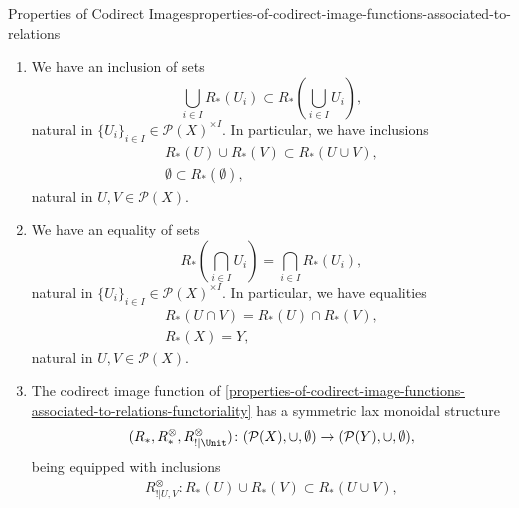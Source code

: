 \begin{proposition}{Properties of Codirect Images}{properties-of-codirect-image-functions-associated-to-relations}
\begin{enumerate}
\begin{itemize}
            \end{itemize}
        \item\label{properties-of-codirect-image-functions-associated-to-relations-lax-preservation-of-colimits}We have an inclusion of sets
            \[
                \bigcup_{i\in I}R_{*}(U_{i})%
                \subset%
                R_{*}(\bigcup_{i\in I}U_{i}),%
            \]%
            natural in $\{U_{i}\}_{i\in I}\in\mathcal{P}(X)^{\times I}$. In particular, we have inclusions%
            \[
                \begin{gathered}
                    R_{*}(U)\cup R_{*}(V) \subset R_{*}(U\cup V),\\
                    \emptyset             \subset R_{*}(\emptyset),
                \end{gathered}
            \]%
            natural in $U,V\in\mathcal{P}(X)$.
        \item\label{properties-of-codirect-image-functions-associated-to-relations-preservation-of-limits}We have an equality of sets
            \[
                    R_{*}(\bigcap_{i\in I}U_{i})%
                    =%
                    \bigcap_{i\in I}R_{*}(U_{i}),%
            \]%
            natural in $\{U_{i}\}_{i\in I}\in\mathcal{P}(X)^{\times I}$. In particular, we have equalities%
            \[
                \begin{gathered}
                    R_{*}(U\cap V) = R_{*}(U)\cap R_{*}(V),\\
                    R_{*}(X)       = Y,
                \end{gathered}
            \]%
            natural in $U,V\in\mathcal{P}(X)$.
        \item\label{properties-of-codirect-image-functions-associated-to-relations-symmetric-lax-monoidality-with-respect-to-unions}The codirect image function of \cref{properties-of-codirect-image-functions-associated-to-relations-functoriality} has a symmetric lax monoidal structure
            \[
                (R_{*},R^{\otimes}_{*},R^{\otimes}_{!|\Unit})
                \colon
                (\mathcal{P}(X),\cup,\emptyset)
                \to
                (\mathcal{P}(Y),\cup,\emptyset),
            \]%
            being equipped with inclusions%
            \[
                \begin{gathered}
                    R^{\otimes}_{!|U,V}   \colon R_{*}(U)\cup R_{*}(V) \subset R_{*}(U\cup V),\\

\end{gathered}\]
\end{enumerate}
\end{proposition}
